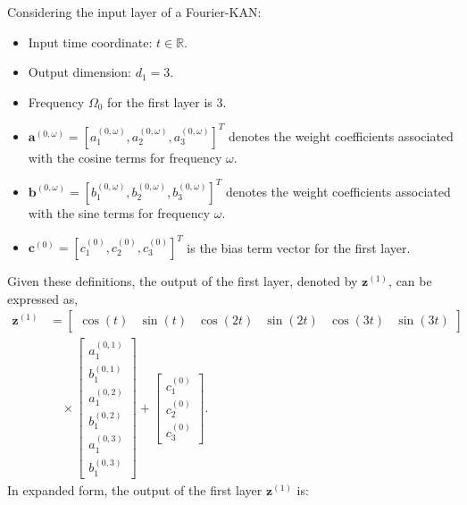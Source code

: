 \documentclass[letterpaper]{article} %
\begin{document}
Considering the input layer of a Fourier-KAN:
\begin{itemize}
    \item Input time coordinate: $t \in \mathbb{R}$.
    \item Output dimension: $d_1=3$.
    \item Frequency \(\Omega_0\) for the first layer is 3.
    \item  \(\mathbf{a}^{(0,\omega)} = [a^{(0,\omega)}_1, a^{(0,\omega)}_2, a^{(0,\omega)}_3]^T\) denotes the weight coefficients associated with the cosine terms for frequency \(\omega\).
    \item \(\mathbf{b}^{(0,\omega)} = [b^{(0,\omega)}_1, b^{(0,\omega)}_2, b^{(0,\omega)}_3]^T\) denotes the weight coefficients associated with the sine terms for frequency \(\omega\).
    \item \(\mathbf{c}^{(0)} = [c^{(0)}_1, c^{(0)}_2, c^{(0)}_3]^T\) is the bias term vector for the first layer.
\end{itemize}
Given these definitions, the output of the first layer, denoted by \(\mathbf{z}^{(1)}\), can be expressed as,
\begin{equation*}
    \begin{aligned}
        \mathbf{z}^{(1)} &= \begin{bmatrix}
        \cos(t) & \sin(t) & \cos(2t) & \sin(2t) & \cos(3t) & \sin(3t)
        \end{bmatrix} \\
        &\quad \times \begin{bmatrix}
        a^{(0,1)}_1 \\
        b^{(0,1)}_1 \\
        a^{(0,2)}_1 \\
        b^{(0,2)}_1 \\
        a^{(0,3)}_1 \\
        b^{(0,3)}_1
        \end{bmatrix}
        + \begin{bmatrix}
        c^{(0)}_1 \\
        c^{(0)}_2 \\
        c^{(0)}_3
        \end{bmatrix}.
    \end{aligned}
\end{equation*}
In expanded form, the output of the first layer \(\mathbf{z}^{(1)}\) is:
\end{document}
